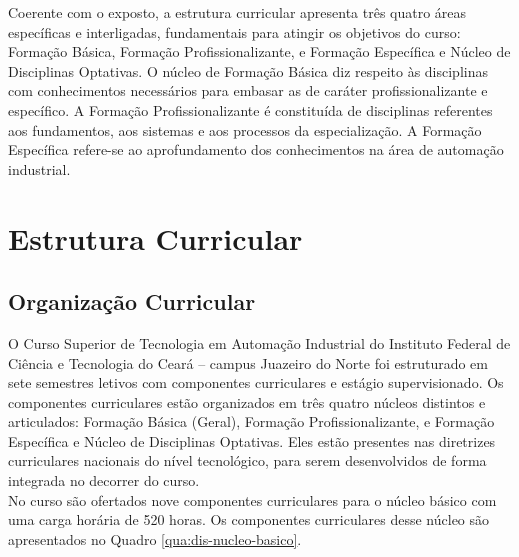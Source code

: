 Coerente com o exposto, a estrutura curricular apresenta três quatro áreas específicas e interligadas, fundamentais para atingir os objetivos do curso: Formação Básica, Formação Profissionalizante, e Formação Específica e Núcleo de Disciplinas Optativas. O núcleo de Formação Básica diz respeito às disciplinas com conhecimentos necessários para embasar as de caráter profissionalizante e específico. A Formação Profissionalizante é constituída de disciplinas referentes aos fundamentos, aos sistemas e aos processos da especialização. A Formação Específica refere-se ao aprofundamento dos conhecimentos na área de automação industrial.\\

\chapter{Estrutura Curricular}

\section{Organização Curricular}

O Curso Superior de Tecnologia em Automação Industrial do Instituto Federal de Ciência e Tecnologia do Ceará – campus Juazeiro do Norte foi estruturado em sete semestres letivos com componentes curriculares e estágio supervisionado. Os componentes curriculares estão organizados em três quatro núcleos distintos e articulados: Formação Básica (Geral), Formação Profissionalizante, e Formação Específica e Núcleo de Disciplinas Optativas. Eles estão presentes nas diretrizes curriculares nacionais do nível tecnológico, para serem desenvolvidos de forma integrada no decorrer do curso.\\

No curso são ofertados nove componentes curriculares para o núcleo básico com uma carga horária de 520 horas. Os componentes curriculares desse núcleo são apresentados no Quadro \ref{qua:dis-nucleo-basico}.\\


